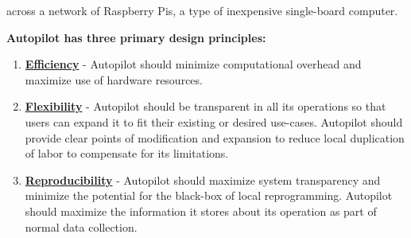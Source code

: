 
 across a network of Raspberry Pis, a type of inexpensive single-board computer. 

\vspace{12pt}

\textbf{Autopilot has three primary design principles:}

\begin{enumerate}
    \item \hyperref[sec:efficiency]{\textbf{Efficiency}} - Autopilot should minimize computational overhead and maximize use of hardware resources.
    \item \hyperref[sec:flexibility]{\textbf{Flexibility}} - Autopilot should be transparent in all its operations so that users can expand it to fit their existing or desired use-cases. Autopilot should provide clear points of modification and expansion to reduce local duplication of labor to compensate for its limitations.
    \item \hyperref[sec:reproducibility]{\textbf{Reproducibility}} - Autopilot should maximize system transparency and minimize the potential for the black-box of local reprogramming. Autopilot should maximize the information it stores about its operation as part of normal data collection.
\end{enumerate}
